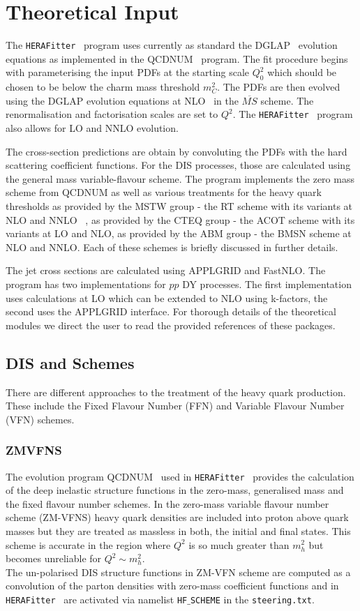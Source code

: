 \documentclass[11pt,a4paper]{article}
\newcommand\fitter{ \mbox{\tt HERAFitter} }
\begin{document}
\section{Theoretical Input}
\label{sec:theory}
The \fitter\ program uses currently as standard the DGLAP~\cite{Gribov:1972ri,Gribov:1972rt,Lipatov:1974qm,Dokshitzer:1977sg,Altarelli:1977zs}
 evolution equations as implemented in the QCDNUM~\cite{qcdnum} program. The fit 
procedure begins with parameterising the input PDFs at the starting 
scale $Q^2_0$ which should be chosen to be below the charm mass threshold
$m_C^2$.
The PDFs are then evolved using the DGLAP evolution equations  
at NLO~\cite{Curci:1980uw,Furmanski:1980cm} in the $\overline{MS}$ scheme.
The renormalisation and factorisation scales are set to $Q^2$. The \fitter\ program
also allows for LO and NNLO evolution. 

The cross-section predictions are obtain by convoluting the PDFs with the 
hard scattering coefficient functions. For the DIS processes, those are calculated 
using the general mass variable-flavour scheme. 
The program implements the  zero mass scheme from QCDNUM as well as
various treatments for the heavy quark thresholds as provided by the MSTW group
- the RT scheme with its variants at NLO and NNLO ~\cite{Thorne:1997ga,Thorne:2006qt}, as provided by the CTEQ group - the ACOT scheme with its variants at LO and NLO, as provided by the ABM group - the BMSN scheme at NLO and NNLO.
Each of these schemes is briefly discussed in further details.

The jet cross sections
are calculated using APPLGRID and FastNLO. The program has two implementations
for $pp$  DY processes. The first implementation uses
calculations at LO which can be extended to NLO using k-factors,
the second uses the APPLGRID interface.
For thorough details of the theoretical modules we direct the user to read the provided  references of these packages.


\subsection{DIS and Schemes}
There are different approaches to the treatment of the heavy quark production. These include the Fixed Flavour Number (FFN) and Variable Flavour Number (VFN) schemes.
\subsubsection{ZMVFNS}
The evolution program QCDNUM~\cite{qcdnum} used in \fitter\ provides 
the calculation of the deep inelastic structure functions in the zero-mass, 
generalised mass and the fixed flavour number schemes. 
In the zero-mass variable flavour number scheme (ZM-VFNS) heavy quark densities are
included into proton above quark masses but they are treated as massless in both,
the initial and final states.
This scheme is accurate in the region where $Q^2$ is so much greater than $m_h^2$
but becomes unreliable for $Q^2 \sim m_h^2$. \\
The un-polarised DIS structure functions in ZM-VFN scheme are computed as a 
convolution of the parton densities with zero-mass coefficient functions and 
in \fitter\ are activated via namelist {\tt HF$\_$SCHEME} in the {\tt steering.txt}.
\end{document}
